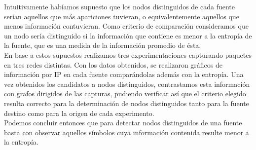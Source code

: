 \indent \indent Intuitivamente habíamos supuesto que los nodos distinguidos de cada fuente serían aquellos que más apariciones tuvieran, o equivalentemente aquellos que menos información contuvieran. Como criterio de comparación consideramos que un nodo sería distinguido si la información que contiene es menor a la entropía de la fuente, que es una medida de la información promedio de ésta.\\
\indent En base a estos supuestos realizamos tres experimentaciones capturando paquetes en tres redes distintas. Con los datos obtenidos, se realizaron gráficos de información por IP en cada fuente comparándolas además con la entropía. Una vez obtenidos los candidatos a nodos distinguidos, contrastamos esta información con grafos dirigidos de las capturas, pudiendo verificar así que el criterio elegido resulta correcto para la determinación de nodos distinguidos tanto para la fuente destino como para la origen de cada experimento.\\
\indent Podemos concluir entonces que para detectar nodos distinguidos de una fuente basta con observar aquellos símbolos cuya información contenida resulte menor a la entropía.\\ 
